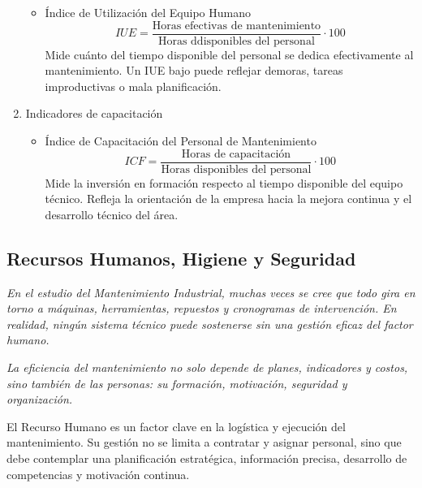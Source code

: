 \documentclass[a4paper,oneside,11pt]{article}
\begin{document}
\begin{enumerate}
\begin{itemize}
        \item Índice de Utilización del Equipo Humano
        \begin{equation*}
            IUE=\dfrac{\text{Horas efectivas de mantenimiento}}{\text{Horas ddisponibles del personal}} \cdot 100
        \end{equation*}
        Mide cuánto del tiempo disponible del personal se dedica efectivamente al mantenimiento. Un IUE bajo puede reflejar demoras, tareas improductivas o mala planificación.
    \end{itemize}

    \item Indicadores de capacitación
    \begin{itemize}
        \item Índice de Capacitación del Personal de Mantenimiento
        \begin{equation*}
            ICF=\dfrac{\text{Horas de capacitación}}{\text{Horas disponibles del personal}} \cdot 100
        \end{equation*}
        Mide la inversión en formación respecto al tiempo disponible del equipo técnico. Refleja la orientación de la empresa hacia la mejora continua y el desarrollo técnico del área.
    \end{itemize}
    
\end{enumerate}

\subsection{Recursos Humanos, Higiene y Seguridad}

\textit{En el estudio del Mantenimiento Industrial, muchas veces se cree que todo gira en torno a máquinas, herramientas, repuestos y cronogramas de intervención. En realidad, ningún sistema técnico puede sostenerse sin una gestión eficaz del factor humano.}

\textit{La eficiencia del mantenimiento no solo depende de planes, indicadores y costos, sino también de las personas: su formación, motivación, seguridad y organización.}

El Recurso Humano es un factor clave en la logística y ejecución del mantenimiento. Su gestión no se limita a contratar y asignar personal, sino que debe contemplar una planificación estratégica, información precisa, desarrollo de competencias y motivación continua.
\end{document}
